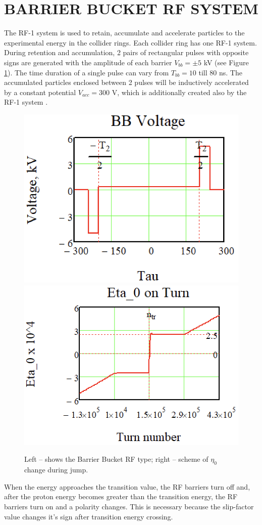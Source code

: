 \documentclass[a4paper,
               keeplastbox,   %
               ]{jacow}
\begin{document}
\section{BARRIER BUCKET RF SYSTEM}

\par The RF-1 system is used to retain, accumulate and accelerate particles to the experimental energy in the collider rings. Each collider ring has one RF-1 system. During retention and accumulation, 2 pairs of rectangular pulses with opposite signs are generated with the amplitude of each barrier $V_{bb}=\pm5$ kV (see Figure \ref{fig:BB_w_eta_0}). The time duration of a single pulse can vary from $T_{bb}=10$ till $80$ ns. The accumulated particles enclosed between 2 pulses will be inductively accelerated by a constant potential $V_{acc}=300$ V, which is additionally created also by the RF-1 system \cite{NICA}. 

\begin{figure}[!htb]
   \centering
   \includegraphics*[width=.484\columnwidth]{img/WEPOPT004_f3-1}
   \includegraphics*[width=.505\columnwidth]{img/WEPOPT004_f3-2}
   \caption{Left – shows the Barrier Bucket RF type; right – scheme of $\eta_{0}$ change during jump.}
   \label{fig:BB_w_eta_0}
\end{figure}

\par When the energy approaches the transition value, the RF barriers turn off and, after the proton energy becomes greater than the transition energy, the RF barriers turn on and a polarity changes. This is necessary because the slip-factor value changes it’s sign after transition energy crossing.
\end{document}
